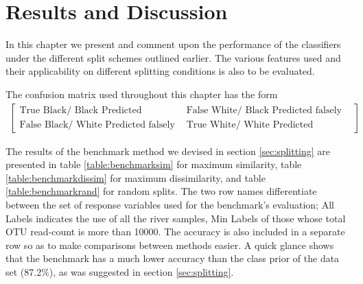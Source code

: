 \chapter{Results and Discussion}
\label{chap:results}
\ifpdf
    \graphicspath{{Chapter3/Figs/Raster/}{Chapter3/Figs/PDF/}{Chapter3/Figs/}}
\else
    \graphicspath{{Chapter3/Figs/Vector/}{Chapter3/Figs/}}
\fi

In this chapter we present and comment upon the performance of the classifiers under the different split schemes outlined earlier. The various features used and their applicability on different splitting conditions is also to be evaluated. 

The confusion matrix used throughout this chapter has the form 
\begin{align}
	\begin{bmatrix}
	\text{True Black/ Black Predicted correctly}&\text{False White/ Black  Predicted falsely}\\
	\text{False Black/ White Predicted falsely}&\text{True White/ White  Predicted correctly}
	\end{bmatrix}
\end{align}



The results of the benchmark method we devised in section \ref{sec:splitting} are presented in table \ref{table:benchmarksim} for maximum similarity, table \ref{table:benchmarkdissim} for maximum dissimilarity, and table \ref{table:benchmarkrand} for random splits. The two row names differentiate between the set of response variables used for the benchmark's evaluation; All Labels indicates the use of all the river samples, Min Labels of those whose total OTU read-count is more than 10000. The accuracy is also included in a separate row so as to make comparisons between methods easier. A quick glance shows that the benchmark has a much lower accuracy than the class prior of the data set (87.2\%), as was suggested in section \ref{sec:splitting}.



